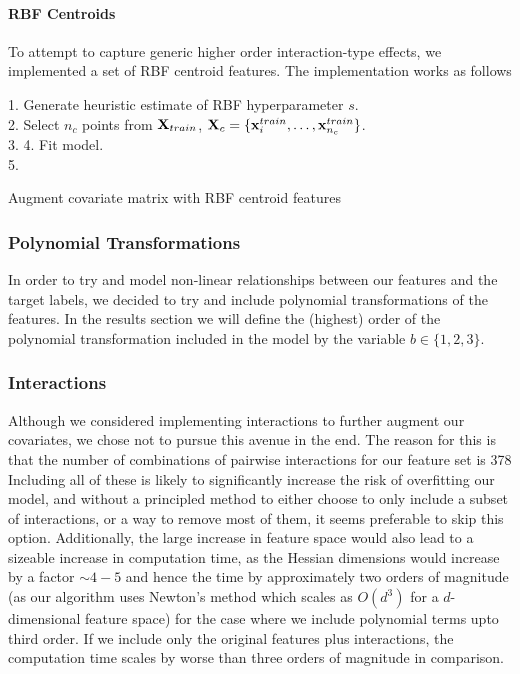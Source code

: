 \paragraph{RBF Centroids}
To attempt to capture generic higher order interaction-type effects, we implemented a set of RBF centroid features. The implementation works as follows \newline
\begin{algorithm}[H]
    1. Generate heuristic estimate of RBF hyperparameter $s$.\\
    2. Select $n_c$ points from $\mathbf{X}_{train}$, $\mathbf{X}_c = \{\mathbf{x}^{train}_i, \dots, \mathbf{x}^{train}_{n_c}\}$.\\
    3.  
    4. Fit model.\\
    5. 
    \caption{Augment covariate matrix with RBF centroid features}
\end{algorithm}

\subsubsection{Polynomial Transformations}
In order to try and model non-linear relationships between our features and the target labels, we decided to try and include polynomial transformations of the features. In the results section we will define the (highest) order of the polynomial transformation included in the model by the variable $b \in \{1,2,3\}$.

\subsubsection{Interactions}
Although we considered implementing interactions to further augment our covariates, we chose not to pursue this avenue in the end. The reason for this is that the number of combinations of pairwise interactions for our feature set is 378 Including all of these is likely to significantly increase the risk of overfitting our model, and without a principled method to either choose to only include a subset of interactions, or a way to remove most of them, it seems preferable to skip this option. Additionally, the large increase in feature space would also lead to a sizeable increase in computation time, as the Hessian dimensions would increase by a factor $\sim 4-5$ and hence the time by approximately two orders of magnitude (as our algorithm uses Newton's method which scales as $O(d^3)$ for a $d$-dimensional feature space) for the case where we include polynomial terms upto third order. If we include only the original features plus interactions, the computation time scales by worse than three orders of magnitude in comparison.

